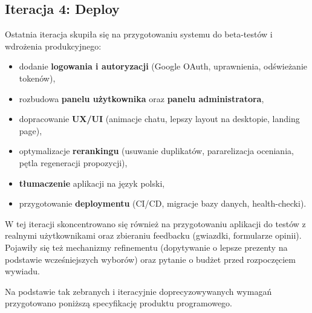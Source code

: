 \documentclass[12pt,a4paper]{article}
\begin{document}
\subsection{Iteracja 4: Deploy}
Ostatnia iteracja skupiła się na przygotowaniu systemu do beta-testów i wdrożenia produkcyjnego:
\begin{itemize}
    \item dodanie \textbf{logowania i autoryzacji} (Google OAuth, uprawnienia, odświeżanie tokenów),
    \item rozbudowa \textbf{panelu użytkownika} oraz \textbf{panelu administratora},
    \item dopracowanie \textbf{UX/UI} (animacje chatu, lepszy layout na desktopie, landing page),
    \item optymalizacje \textbf{rerankingu} (usuwanie duplikatów, pararelizacja oceniania, pętla regeneracji propozycji),
    \item \textbf{tłumaczenie} aplikacji na język polski,
    \item przygotowanie \textbf{deploymentu} (CI/CD, migracje bazy danych, health-checki).
\end{itemize}
W tej iteracji skoncentrowano się również na przygotowaniu aplikacji do testów z realnymi użytkownikami oraz zbieraniu feedbacku (gwiazdki, formularze opinii). Pojawiły się też mechanizmy refinementu (dopytywanie o lepsze prezenty na podstawie wcześniejszych wyborów) oraz pytanie o budżet przed rozpoczęciem wywiadu.

Na podstawie tak zebranych i iteracyjnie doprecyzowywanych wymagań przygotowano poniższą specyfikację produktu programowego.
\end{document}
